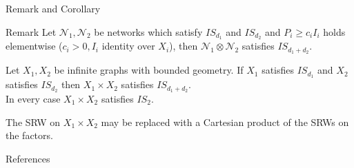 \documentclass{beamer}\usepackage[]{graphicx}\usepackage[]{color}
\begin{document}
\begin{frame}[fragile]{Remark and Corollary}
\begin{block}{Remark}
Let $\mathcal{N}_1, \mathcal{N}_2$ be networks which satisfy $IS_{d_1}$ and $IS_{d_2}$ and $P_i \ge c_i I_i$ holds elementwise ($c_i > 0, I_i$ identity over $X_i$), then $\mathcal{N}_1 \otimes \mathcal{N}_2$ satisfies $IS_{d_1+d_2}$.
\end{block}
\vspace{5mm}
\begin{corollary}
Let $X_1, X_2$ be infinite graphs with bounded geometry. If $X_1$ satisfies $IS_{d_1}$ and $X_2$ satisfies $IS_{d_2}$ then $X_1 \times X_2$ satisfies $IS_{d_1+d_2}$.\\
In every case $X_1 \times X_2$ satisfies $IS_2$.
\end{corollary}

The SRW on $X_1 \times X_2$ may be replaced with a Cartesian product of the SRWs on the factors.
\end{frame}

\nocite{woess2000}

\renewcommand*{\bibfont}{\scriptsize}
\begin{frame}[fragile]{References}
\printbibliography
\end{frame}

\end{document}
